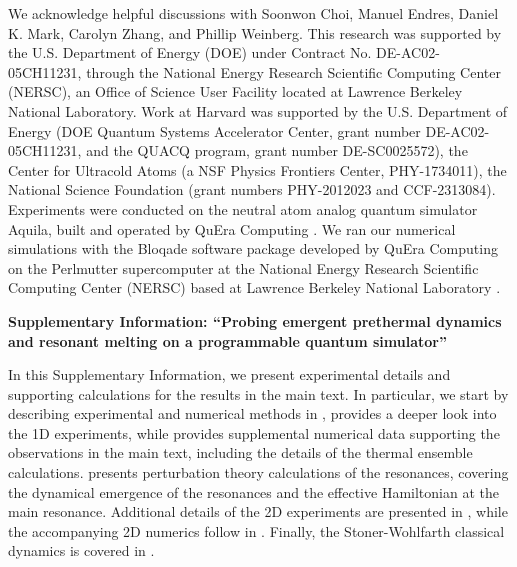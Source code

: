 \documentclass[english,floatfix,twocolumn,showpacs, aps, prx, reprint, superscriptaddress, longbibliography]{revtex4-2}
\begin{document}

\begin{acknowledgments}

We acknowledge helpful discussions with Soonwon Choi, Manuel Endres, Daniel K. Mark, Carolyn Zhang, and Phillip Weinberg. This research was supported by the U.S. Department of Energy (DOE) under Contract No. DE-AC02-05CH11231, through the National Energy Research Scientific Computing Center (NERSC), an Office of Science User Facility located at Lawrence Berkeley National Laboratory. 
Work at Harvard was supported by the U.S. Department of Energy (DOE Quantum Systems Accelerator Center, grant number DE-AC02-05CH11231, and the QUACQ program, grant number DE-SC0025572),  the Center for Ultracold Atoms (a NSF Physics Frontiers Center, PHY-1734011), the National Science Foundation (grant numbers PHY-2012023 and  CCF-2313084).  Experiments were conducted on the neutral atom analog quantum simulator Aquila, built and operated by QuEra Computing \cite{aquila:2023}. We ran our numerical simulations with the Bloqade software package developed by QuEra Computing \cite{BloqadeJulia:2023, bloqadepython:2024} on the Perlmutter supercomputer at the National Energy Research Scientific Computing Center (NERSC) based at Lawrence Berkeley National Laboratory \cite{perlmutter:2023}.

\end{acknowledgments}

%



\clearpage
\onecolumngrid
\begin{center}
{\bf Supplementary Information: ``Probing emergent prethermal dynamics and resonant melting on a programmable quantum simulator''}
\end{center}

In this Supplementary Information, we present experimental details and supporting calculations for the results in the main text. In particular, we start by describing experimental and numerical methods in ,  provides a deeper look into the 1D experiments, while  provides supplemental numerical data supporting the observations in the main text, including the details of the thermal ensemble calculations.  presents perturbation theory calculations of the resonances, covering the dynamical emergence of the resonances and the effective Hamiltonian at the main resonance. Additional details of the 2D experiments are presented in , while the accompanying 2D numerics follow in . Finally, the Stoner-Wohlfarth classical dynamics is covered in .
\end{document}
